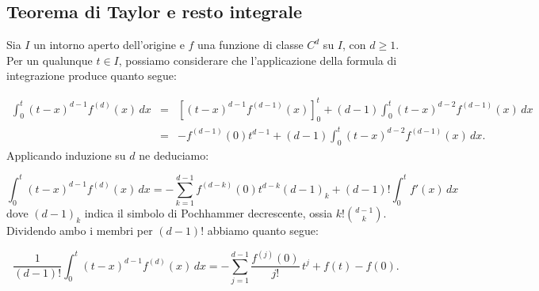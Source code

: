 \documentclass[a4paper,twoside]{article}
\theoremstyle{definition}
\numberwithin{theorem}{section}
\begin{document}
\subsection{Teorema di Taylor e resto integrale}
Sia $I$ un intorno aperto dell'origine e $f$ una funzione di classe $C^d$ su $I$, con $d\geq 1$. Per un qualunque $t\in I$, possiamo considerare che l'applicazione della formula di integrazione produce quanto segue:

\begin{eqnarray*} \int_{0}^{t} (t-x)^{d-1} f^{(d)}(x)\,dx &=&\left[(t-x)^{d-1} f^{(d-1)}(x)\right]_{0}^{t}+(d-1)\int_{0}^{t}(t-x)^{d-2}f^{(d-1)}(x)\,dx\\ &=&-f^{(d-1)}(0)t^{d-1}+(d-1)\int_{0}^{t}(t-x)^{d-2}f^{(d-1)}(x)\,dx. \end{eqnarray*}
Applicando induzione su $d$ ne deduciamo:

$$ \int_{0}^{t} (t-x)^{d-1} f^{(d)}(x)\,dx = -\sum_{k=1}^{d-1}f^{(d-k)}(0) t^{d-k}(d-1)_k + (d-1)!\int_{0}^{t}f'(x)\,dx $$
dove $(d-1)_k$ indica il simbolo di Pochhammer decrescente, ossia $k!\binom{d-1}{k}$.\\ Dividendo ambo i membri per $(d-1)!$ abbiamo quanto segue:

$$ \frac{1}{(d-1)!}\int_{0}^{t}(t-x)^{d-1}f^{(d)}(x)\,dx = -\sum_{j=1}^{d-1}\frac{f^{(j)}(0)}{j!}\,t^j + f(t)-f(0). $$
\end{document}
